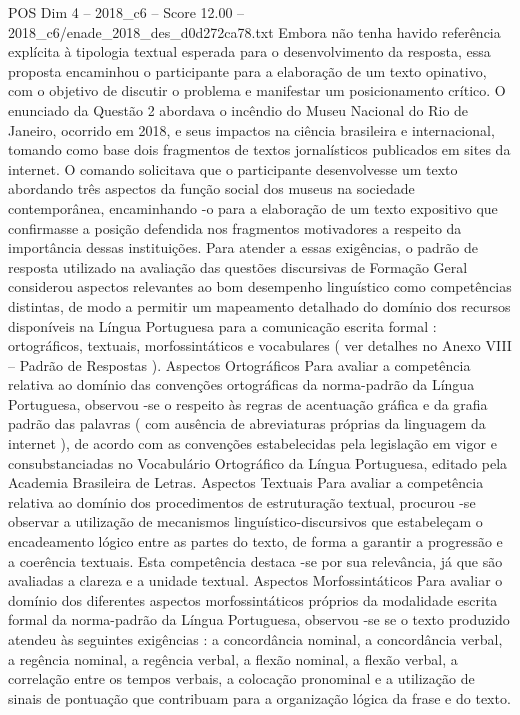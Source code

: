 \begin{textsample}{POS Dim 4 – 2018\_c6 – Score 12.00 – 2018\_c6/enade\_2018\_des\_d0d272ca78.txt}
Embora não tenha havido referência explícita à tipologia textual esperada para o desenvolvimento da resposta, essa proposta encaminhou o participante para a elaboração de um texto opinativo, com o objetivo de discutir o problema e manifestar um posicionamento crítico.
O enunciado da Questão 2 abordava o incêndio do Museu Nacional do Rio de Janeiro, ocorrido em 2018, e seus impactos na ciência brasileira e internacional, tomando como base dois fragmentos de textos jornalísticos publicados em sites da internet.
O comando solicitava que o participante desenvolvesse um texto abordando três aspectos da função social dos museus na sociedade contemporânea, encaminhando -o para a elaboração de um texto expositivo que confirmasse a posição defendida nos fragmentos motivadores a respeito da importância dessas instituições.
Para atender a essas exigências, o padrão de resposta utilizado na avaliação das questões discursivas de Formação Geral considerou aspectos relevantes ao bom desempenho linguístico como competências distintas, de modo a permitir um mapeamento detalhado do domínio dos recursos disponíveis na Língua Portuguesa para a comunicação escrita formal : ortográficos, textuais, morfossintáticos e vocabulares ( ver detalhes no Anexo VIII – Padrão de Respostas ).
Aspectos Ortográficos Para avaliar a competência relativa ao domínio das convenções ortográficas da norma-padrão da Língua Portuguesa, observou -se o respeito às regras de acentuação gráfica e da grafia padrão das palavras ( com ausência de abreviaturas próprias da linguagem da internet ), de acordo com as convenções estabelecidas pela legislação em vigor e consubstanciadas no Vocabulário Ortográfico da Língua Portuguesa, editado pela Academia Brasileira de Letras.
Aspectos Textuais Para avaliar a competência relativa ao domínio dos procedimentos de estruturação textual, procurou -se observar a utilização de mecanismos linguístico-discursivos que estabeleçam o encadeamento lógico entre as partes do texto, de forma a garantir a progressão e a coerência textuais.
Esta competência destaca -se por sua relevância, já que são avaliadas a clareza e a unidade textual.
Aspectos Morfossintáticos Para avaliar o domínio dos diferentes aspectos morfossintáticos próprios da modalidade escrita formal da norma-padrão da Língua Portuguesa, observou -se se o texto produzido atendeu às seguintes exigências : a concordância nominal, a concordância verbal, a regência nominal, a regência verbal, a flexão nominal, a flexão verbal, a correlação entre os tempos verbais, a colocação pronominal e a utilização de sinais de pontuação que contribuam para a organização lógica da frase e do texto.

\end{textsample}
